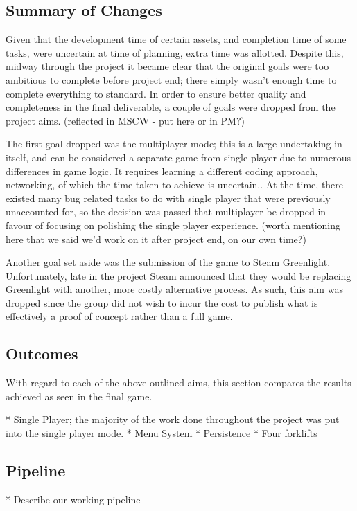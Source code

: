 \documentclass[12pt]{article}
\begin{document}
\subsection{Summary of Changes}
Given that the development time of certain assets, and completion time of some tasks, were uncertain at time of planning, extra time was allotted. Despite this, midway through the project it became clear that the original goals were too ambitious to complete before project end; there simply wasn't enough time to complete everything to standard. In order to ensure better quality and completeness in the final deliverable, a couple of goals were dropped from the project aims. (reflected in MSCW - put here or in PM?)

The first goal dropped was the multiplayer mode; this is a large undertaking in itself, and can be considered a separate game from single player due to numerous differences in game logic. It requires learning a different coding approach, networking, of which the time taken to achieve is uncertain.. At the time, there existed many bug related tasks to do with single player that were previously unaccounted for, so the decision was passed that multiplayer be dropped in favour of focusing on polishing the single player experience. (worth mentioning here that we said we'd work on it after project end, on our own time?)

Another goal set aside was the submission of the game to Steam Greenlight. Unfortunately, late in the project Steam announced that they would be replacing Greenlight with another, more costly alternative process. As such, this aim was dropped since the group did not wish to incur the cost to publish what is effectively a proof of concept rather than a full game.
 
\subsection{Outcomes}
With regard to each of the above outlined aims, this section compares the results achieved as seen in the final game. 

* Single Player; the majority of the work done throughout the project was put into the single player mode. 
* Menu System
* Persistence
* Four forklifts

\subsection{Pipeline}
* Describe our working pipeline
\end{document}
